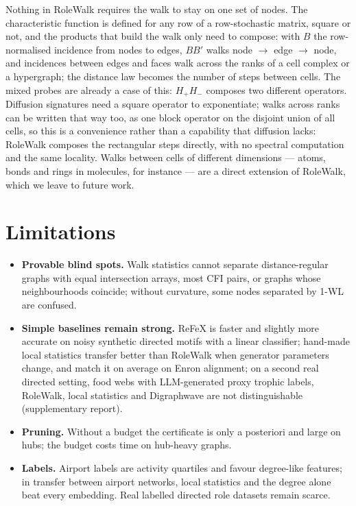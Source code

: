 \documentclass[10pt]{article}
\theoremstyle{definition}
\begin{document}
Nothing in RoleWalk requires the walk to stay on one set of nodes.
The characteristic function is defined for any row of a row-stochastic matrix, square or not, and the products that build the walk only need to compose: with $B$ the row-normalised incidence from nodes to edges, $B B'$ walks node $\to$ edge $\to$ node, and incidences between edges and faces walk across the ranks of a cell complex or a hypergraph; the distance law becomes the number of steps between cells.
The mixed probes are already a case of this: $H_+H_-$ composes two different operators.
Diffusion signatures need a square operator to exponentiate; walks across ranks can be written that way too, as one block operator on the disjoint union of all cells, so this is a convenience rather than a capability that diffusion lacks: RoleWalk composes the rectangular steps directly, with no spectral computation and the same locality.
Walks between cells of different dimensions --- atoms, bonds and rings in molecules, for instance --- are a direct extension of RoleWalk, which we leave to future work.

\section{Limitations}

\begin{itemize}
\item \textbf{Provable blind spots.} Walk statistics cannot separate distance-regular graphs with equal intersection arrays, most CFI pairs, or graphs whose neighbourhoods coincide; without curvature, some nodes separated by 1-WL are confused.
\item \textbf{Simple baselines remain strong.} ReFeX is faster and slightly more accurate on noisy synthetic directed motifs with a linear classifier; hand-made local statistics transfer better than RoleWalk when generator parameters change, and match it on average on Enron alignment; on a second real directed setting, food webs with LLM-generated proxy trophic labels, RoleWalk, local statistics and Digraphwave are not distinguishable (supplementary report).
\item \textbf{Pruning.} Without a budget the certificate is only a posteriori and large on hubs; the budget costs time on hub-heavy graphs.
\item \textbf{Labels.} Airport labels are activity quartiles and favour degree-like features; in transfer between airport networks, local statistics and the degree alone beat every embedding. Real labelled directed role datasets remain scarce.
\end{itemize}
\end{document}
